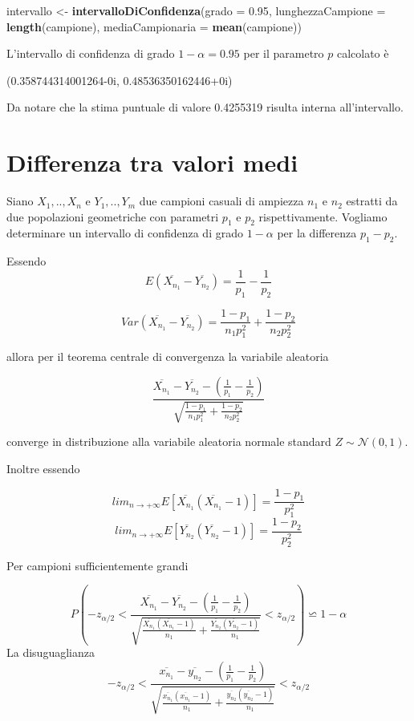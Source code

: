 \documentclass[]{book}
\newenvironment{Shaded}{\begin{snugshade}}{\end{snugshade}}
\newcommand{\KeywordTok}[1]{\textcolor[rgb]{0.13,0.29,0.53}{\textbf{#1}}}
\newcommand{\DataTypeTok}[1]{\textcolor[rgb]{0.13,0.29,0.53}{#1}}
\newcommand{\FloatTok}[1]{\textcolor[rgb]{0.00,0.00,0.81}{#1}}
\newcommand{\StringTok}[1]{\textcolor[rgb]{0.31,0.60,0.02}{#1}}
\newcommand{\NormalTok}[1]{#1}
\begin{document}
\begin{Shaded}
\begin{Highlighting}[]
\NormalTok{intervallo <-}\StringTok{ }\KeywordTok{intervalloDiConfidenza}\NormalTok{(}\DataTypeTok{grado =} \FloatTok{0.95}\NormalTok{, }
                                     \DataTypeTok{lunghezzaCampione =} \KeywordTok{length}\NormalTok{(campione), }
                                     \DataTypeTok{mediaCampionaria =} \KeywordTok{mean}\NormalTok{(campione))}
\end{Highlighting}
\end{Shaded}

L'intervallo di confidenza di grado \(1-\alpha = 0.95\) per il parametro
\(p\) calcolato è

(0.358744314001264-0i, 0.48536350162446+0i)

Da notare che la stima puntuale di valore 0.4255319 risulta interna
all'intervallo.

\section{Differenza tra valori medi}\label{differenza-tra-valori-medi}

Siano \(X_1,..,X_{n}\) e \(Y_1,..,Y_{m}\) due campioni casuali di
ampiezza \(n_1\) e \(n_2\) estratti da due popolazioni geometriche con
parametri \(p_1\) e \(p_2\) rispettivamente. Vogliamo determinare un
intervallo di confidenza di grado \(1-\alpha\) per la differenza
\(p_1 - p_2\).

Essendo
\[E(\overline{X_{n_1}}-\overline{Y_{n_2}}) = \frac{1}{p_1} - \frac{1}{p_2}\]

\[Var(\overline{X_{n_1}}-\overline{Y_{n_2}}) = \frac{1-p_1}{n_1 p_1^2} + \frac{1-p_2}{n_2 p_2^2}\]

allora per il teorema centrale di convergenza la variabile aleatoria

\[\frac{\overline{X_{n_1}} - \overline{Y_{n_2}} - \left( \frac{1}{p_1} - \frac{1}{p_2} \right)}{\sqrt{\frac{1-p_1}{n_1 p_1^2} + \frac{1-p_2}{n_2 p_2^2}}}\]

converge in distribuzione alla variabile aleatoria normale standard
\(Z \sim \mathcal{N}(0, 1)\).

Inoltre essendo

\[lim_{n \to + \infty} E[\overline{X_{n_1}}(\overline{X_{n_1}} - 1)] = \frac{1-p_1}{p_1^2}\]
\[lim_{n \to + \infty} E[\overline{Y_{n_2}}(\overline{Y_{n_2}} -1)] = \frac{1-p_2}{p_2^2}\]

Per campioni sufficientemente grandi

\[P\left( -z_{\alpha/2} < \frac{\overline{X_{n_1}} - \overline{Y_{n_2}} - \left( \frac{1}{p_1} - \frac{1}{p_2} \right)}{\sqrt{\frac{\overline{X_{n_1}}(\overline{X_{n_1}} - 1)}{n_1} + \frac{\overline{Y_{n_2}}(\overline{Y_{n_2}} - 1)}{n_1}}} < z_{\alpha/2} \right) \backsimeq 1 - \alpha\]
La disuguaglianza
\[-z_{\alpha/2} < \frac{\overline{x_{n_1}} - \overline{y_{n_2}} - \left( \frac{1}{p_1} - \frac{1}{p_2} \right)}{\sqrt{\frac{\overline{x_{n_1}}(\overline{x_{n_1}} - 1)}{n_1} + \frac{\overline{y_{n_2}}(\overline{y_{n_2}} - 1)}{n_1}}} < z_{\alpha/2}\]
\end{document}
